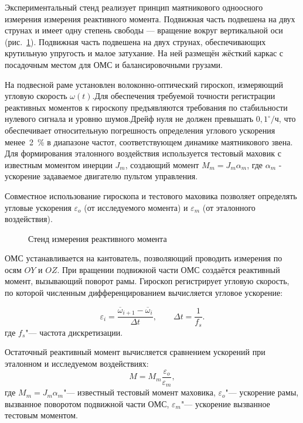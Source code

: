 Экспериментальный стенд реализует принцип маятникового одноосного измерения измерения реактивного момента.
Подвижная часть подвешена на двух струнах и имеет одну степень свободы — вращение вокруг вертикальной оси (рис.~\cref{fig:yoiom}). Подвижная часть подвешена на двух струнах, обеспечивающих крутильную упругость и малое затухание. На ней размещён жёсткий каркас с посадочным местом для ОМС и балансировочными грузами. 

На подвесной раме установлен волоконно-оптический гироскоп, измеряющий угловую скорость $\omega(t)$.Для обеспечения требуемой точности регистрации реактивных моментов к гироскопу предъявляются требования по стабильности нулевого сигнала и уровню шумов.Дрейф нуля не должен превышать $0{,}1^\circ/\text{ч}$, что обеспечивает относительную погрешность определения углового ускорения менее~2~\% в диапазоне частот, соответствующем динамике маятникового звена. Для формирования эталонного воздействия используется тестовый маховик с известным моментом инерции $J_m$, создающий момент $M_m=J_m\alpha_m$, где $\alpha_m$ - ускорение задаваемое двигателю пультом управления.

Совместное использование гироскопа и тестового маховика позволяет определять угловые ускорения $\varepsilon_o$ (от исследуемого момента) и $\varepsilon_m$ (от эталонного воздействия).

\begin{figure}[!h] 
	\caption{Стенд измерения реактивного момента}
	\label{fig:yoiom} 
\end{figure}

ОМС устанавливается на кантователь, позволяющий проводить измерения по осям $OY$ и $OZ$.
При вращении подвижной части ОМС создаётся реактивный момент, вызывающий поворот рамы. Гироскоп регистрирует угловую скорость, по которой численным дифференцированием вычисляется угловое ускорение:
\begin{samepage}
	\begin{equation*}
		\label{eq:mean_acc}
		\varepsilon_{i}
		= \frac{\overline{\omega}_{i+1}-\overline{\omega}_{i}}{\Delta t},
		\qquad
		\Delta t = \frac{1}{f_s}.
	\end{equation*}
	где \(f_s\)"--- частота дискретизации.
\end{samepage}


Остаточный реактивный момент вычисляется сравнением ускорений при эталонном и исследуемом воздействиях:
\begin{equation*}
	M = M_m\frac{\varepsilon_o}{\varepsilon_m},
\end{equation*}
где \(M_m = J_m\alpha_m\)"--- известный тестовый момент маховика, \(\varepsilon_o\)"--- ускорение рамы, вызванное поворотом подвижной части ОМС, \(\varepsilon_m\)"--- ускорение вызванное тестовым моментом.


